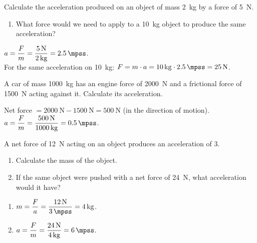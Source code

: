 \begin{exercise}
    Calculate the acceleration produced on an object of mass \qty{2}{\kg} by a force of \qty{5}{\newton}.
    \begin{enumerate}[label=\letraminuscula]
        \item What force would we need to apply to a \qty{10}{\kg} object to produce the same acceleration?
    \end{enumerate}
    \begin{solu}
        \(a = \dfrac{F}{m} = \dfrac{\qty{5}{\newton}}{\qty{2}{\kg}} = \qty{2.5}{\mpss}\). \\
        For the same acceleration on \qty{10}{\kg}: \(F = m \cdot a = \qty{10}{\kg} \cdot \qty{2.5}{\mpss} = \qty{25}{\newton}\).
    \end{solu}
\end{exercise}

\begin{exercise}
    A car of mass \qty{1000}{\kg} has an engine force of \qty{2000}{\newton} and a frictional force of \qty{1500}{\newton} acting against it. Calculate its acceleration.
    \begin{solu}
        Net force \(= \qty{2000}{\newton} - \qty{1500}{\newton} = \qty{500}{\newton}\) (in the direction of motion). \\
        \(a = \dfrac{F}{m} = \dfrac{\qty{500}{\newton}}{\qty{1000}{\kg}} = \qty{0.5}{\mpss}\).
    \end{solu}
\end{exercise}

\begin{exercise}
    A net force of \qty{12}{\newton} acting on an object produces an acceleration of \qty{3}{\mpss}.
    \begin{enumerate}[label=\letraminuscula]
        \item Calculate the mass of the object.
        \item If the same object were pushed with a net force of \qty{24}{\newton}, what acceleration would it have?
    \end{enumerate}
    \begin{solu}
        \begin{enumerate}[label=\alph*)]
            \item \(m = \dfrac{F}{a} = \dfrac{\qty{12}{\newton}}{\qty{3}{\mpss}} = \qty{4}{\kg}\).
            \item \(a = \dfrac{F}{m} = \dfrac{\qty{24}{\newton}}{\qty{4}{\kg}} = \qty{6}{\mpss}\).
        \end{enumerate}
    \end{solu}
\end{exercise}


